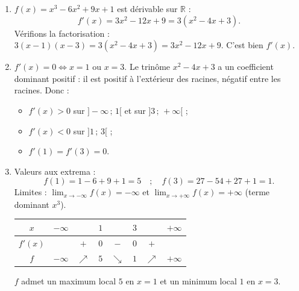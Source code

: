 \documentclass[11pt]{article}
\begin{document}
\begin{corrige}
\begin{enumerate}
\item $f(x)=x^3-6x^2+9x+1$ est dérivable sur $\mathbb{R}$ :
\[ f'(x)=3x^2-12x+9 = 3(x^2-4x+3). \]
Vérifions la factorisation : $3(x-1)(x-3)=3(x^2-4x+3)=3x^2-12x+9$. C'est bien $f'(x)$.
\item $f'(x)=0 \iff x=1$ ou $x=3$. Le trinôme $x^2-4x+3$ a un coefficient dominant positif : il est positif à l'extérieur des racines, négatif entre les racines. Donc :
\begin{itemize}
\item $f'(x)>0$ sur $]-\infty\,;\,1[$ et sur $]3\,;\,+\infty[$ ;
\item $f'(x)<0$ sur $]1\,;\,3[$ ;
\item $f'(1)=f'(3)=0$.
\end{itemize}
\item Valeurs aux extrema :
\[ f(1)=1-6+9+1=5 \quad ; \quad f(3)=27-54+27+1=1. \]
Limites : $\lim_{x\to-\infty}f(x)=-\infty$ et $\lim_{x\to+\infty}f(x)=+\infty$ (terme dominant $x^3$).
\begin{center}
\begin{tabular}{|c|ccccccc|}
\hline
$x$ & $-\infty$ & & $1$ & & $3$ & & $+\infty$ \\
\hline
$f'(x)$ & & $+$ & $0$ & $-$ & $0$ & $+$ & \\
\hline
$f$ & $-\infty$ & $\nearrow$ & $5$ & $\searrow$ & $1$ & $\nearrow$ & $+\infty$ \\
\hline
\end{tabular}
\end{center}
$f$ admet un maximum local $5$ en $x=1$ et un minimum local $1$ en $x=3$.
\end{enumerate}
\end{corrige}
\end{document}
